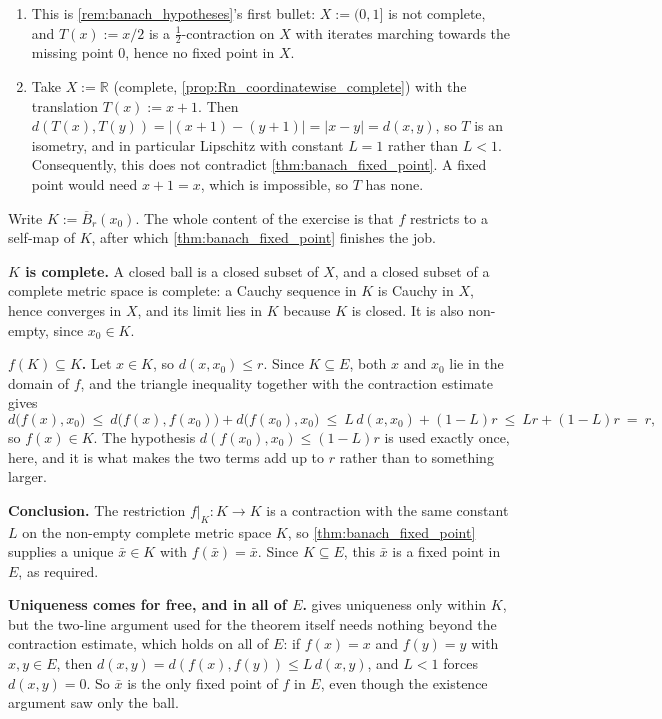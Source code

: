 \begin{exercisesolution}
\label{sol:banach_hypotheses_sharp}
\begin{enumerate}[label=\textbf{(\alph*)}]
  \item This is \cref{rem:banach_hypotheses}'s first bullet: $X := (0,1]$ is not complete,
    and $T(x) := x/2$ is a $\tfrac12$-contraction on $X$ with iterates marching towards the
    missing point $0$, hence no fixed point in $X$.
  \item Take $X := \mathbb{R}$ (complete, \cref{prop:Rn_coordinatewise_complete}) with the
    translation $T(x) := x+1$. Then $d(T(x),T(y)) = |(x+1)-(y+1)| = |x-y| = d(x,y)$, so $T$ is an
    isometry, and in particular Lipschitz with constant $L=1$ rather than $L<1$. Consequently,
    this does not contradict \cref{thm:banach_fixed_point}. A fixed point would need $x+1=x$,
    which is impossible, so $T$ has none.
\end{enumerate}
\end{exercisesolution}

\begin{exercisesolution}
\label{sol:kobel_local_banach_fixed_point}
Write $K := \overline{B}_r(x_0)$. The whole content of the exercise is that $f$ restricts to a
self-map of $K$, after which \cref{thm:banach_fixed_point} finishes the job.

\textbf{$K$ is complete.} A closed ball is a closed subset of $X$, and a closed subset of a
complete metric space is complete: a Cauchy sequence in $K$ is Cauchy in $X$, hence converges in
$X$, and its limit lies in $K$ because $K$ is closed. It is also non-empty, since $x_0 \in K$.

\textbf{$f(K) \subseteq K$.} Let $x \in K$, so $d(x,x_0) \le r$. Since $K \subseteq E$, both $x$
and $x_0$ lie in the domain of $f$, and the triangle inequality together with the contraction
estimate gives
\[d\big(f(x),x_0\big) \ \le\ d\big(f(x),f(x_0)\big) + d\big(f(x_0),x_0\big)
  \ \le\ L\,d(x,x_0) + (1-L)r \ \le\ Lr + (1-L)r \ =\ r,\]
so $f(x) \in K$. The hypothesis $d(f(x_0),x_0) \le (1-L)r$ is used exactly once, here, and it is
what makes the two terms add up to $r$ rather than to something larger.

\textbf{Conclusion.} The restriction $f|_K : K \to K$ is a contraction with the same constant $L$
on the non-empty complete metric space $K$, so \cref{thm:banach_fixed_point} supplies a unique
$\bar x \in K$ with $f(\bar x) = \bar x$. Since $K \subseteq E$, this $\bar x$ is a fixed point in
$E$, as required.

\textbf{Uniqueness comes for free, and in all of $E$.}  gives
uniqueness only within $K$, but the two-line argument used for the theorem itself needs nothing
beyond the contraction estimate, which holds on all of $E$: if $f(x)=x$ and $f(y)=y$ with
$x,y \in E$, then $d(x,y) = d(f(x),f(y)) \le L\,d(x,y)$, and $L<1$ forces $d(x,y)=0$. So $\bar x$
is the only fixed point of $f$ in $E$, even though the existence argument saw only the ball.
\end{exercisesolution}

